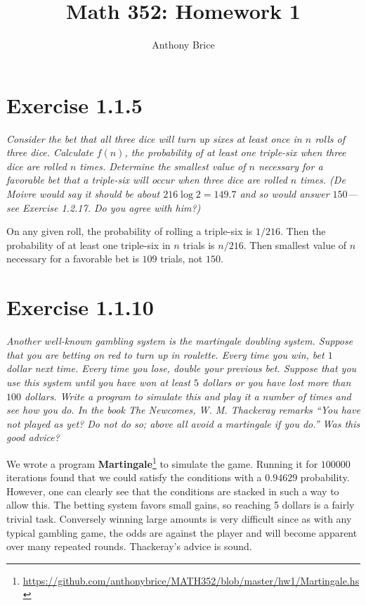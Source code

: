\documentclass{tufte-handout}
\title{Math 352: Homework 1}
\author{Anthony Brice}
\begin{document}
\maketitle

\section{Exercise 1.1.5}

\begin{description}
\item \textit{Consider the bet that all three dice will turn up sixes
    at least once in $n$ rolls of three dice. Calculate $f(n)$, the
    probability of at least one triple-six when three dice are rolled
    $n$ times. Determine the smallest value of $n$ necessary for a
    favorable bet that a triple-six will occur when three dice are
    rolled $n$ times. (De Moivre would say it should be about $216
    \log 2 = 149.7$ and so would answer $150$---see Exercise
    1.2.17. Do you agree with him?)}
\end{description}

On any given roll, the probability of rolling a triple-six is $1/216$. Then
the probability of at least one triple-six in $n$ trials is
$n/216$. Then smallest value of $n$ necessary for a favorable bet is $109$
trials, not $150$.

\section{Exercise 1.1.10}

\begin{description}
\item \textit{Another well-known gambling system is the martingale
    doubling system. Suppose that you are betting on red to turn up in
    roulette. Every time you win, bet $1$ dollar next time. Every time
    you lose, double your previous bet. Suppose that you use this
    system until you have won at least $5$ dollars or you have lost
    more than $100$ dollars. Write a program to simulate this and play
    it a number of times and see how you do. In the book \emph{The
      Newcomes}, W. M. Thackeray remarks ``You have not played as yet?
    Do not do so; above all avoid a martingale if you do.'' Was this
    good advice?}
\end{description}

We wrote a program \textbf{Martingale}\footnote{
  \url{https://github.com/anthonybrice/MATH352/blob/master/hw1/Martingale.hs}}
to simulate the game. Running it for $100000$ iterations found that we
could satisfy the conditions with a $0.94629$ probability. However,
one can clearly see that the conditions are stacked in such a way to
allow this. The betting system favors small gains, so reaching 5
dollars is a fairly trivial task. Conversely winning large amounts is
very difficult since as with any typical gambling game, the odds are
against the player and will become apparent over many repeated
rounds. Thackeray's advice is sound.
\end{document}
